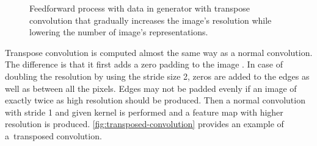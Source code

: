 \begin{figure}[!h]
    \caption{\label{fig:generator-architecture}Feedforward process with data in generator with transpose convolution that gradually increases the image's resolution while lowering the number of image's representations.}
\end{figure}

Transpose convolution is computed almost the same way as a normal convolution. The difference is that it first adds a zero padding to the image \cite{dumoulin2016guide}. In case of doubling the resolution by using the stride size 2, zeros are added to the edges as well as between all the pixels. Edges may not be padded evenly if an image of exactly twice as high resolution should be produced. Then a normal convolution with stride 1 and given kernel is performed and a feature map with higher resolution is produced. \autoref{fig:transposed-convolution} provides an example of a~transposed convolution.


